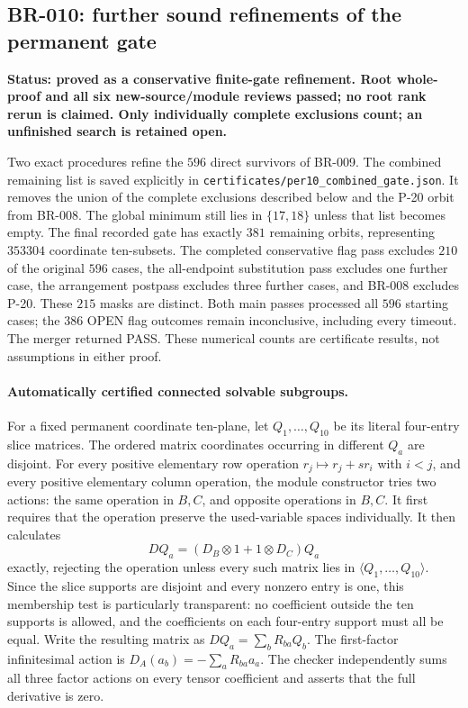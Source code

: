 \subsection*{BR-010: further sound refinements of the permanent gate}
\textbf{Status: proved as a conservative finite-gate refinement.  Root whole-proof
and all six new-source/module reviews passed; no root rank rerun is claimed.
Only individually complete exclusions count; an unfinished search is
retained open.}

Two exact procedures refine the $596$ direct survivors of BR-009.
The combined remaining list is saved explicitly in
\texttt{certificates/per10\_combined\_gate.json}.  It removes the union
of the complete exclusions described below and the P-20 orbit from
BR-008.  The global minimum still lies in $\{17,18\}$ unless that list
becomes empty.  The final recorded gate has exactly $381$ remaining orbits, representing
$353304$ coordinate ten-subsets.  The completed conservative flag pass
excludes $210$ of the original $596$ cases, the all-endpoint substitution
pass excludes one further case, the arrangement postpass excludes three
further cases, and BR-008 excludes P-20.  These $215$ masks are distinct.
Both main passes processed all $596$ starting cases; the $386$ OPEN
flag outcomes remain inconclusive, including every timeout.  The
merger returned PASS.  These numerical counts are certificate results,
not assumptions in either proof.

\paragraph{Automatically certified connected solvable subgroups.}
For a fixed permanent coordinate ten-plane, let $Q_1,\ldots,Q_{10}$
be its literal four-entry slice matrices.  The ordered matrix
coordinates occurring in different $Q_a$ are disjoint.  For every
positive elementary row operation $r_j\mapsto r_j+s r_i$ with
$i<j$, and every positive elementary column operation, the module
constructor tries two actions: the same operation in $B,C$, and
opposite operations in $B,C$.  It first requires that the operation
preserve the used-variable spaces individually.  It then calculates
\[
 D Q_a=(D_B\otimes 1+1\otimes D_C)Q_a
\]
exactly, rejecting the operation unless every such matrix lies in
$\langle Q_1,\ldots,Q_{10}\rangle$.  Since the slice supports are
disjoint and every nonzero entry is one, this membership test is
particularly transparent: no coefficient outside the ten supports
is allowed, and the coefficients on each four-entry support must
all be equal.  Write the resulting matrix as
$DQ_a=\sum_b R_{ba}Q_b$.  The first-factor infinitesimal action is
$D_A(a_b)=-\sum_aR_{ba}a_a$.  The checker independently sums all three
factor actions on every tensor coefficient and asserts that the full
derivative is zero.

